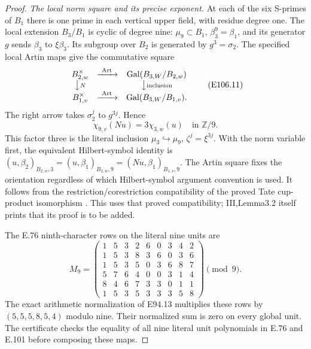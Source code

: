 \begin{proof}
\emph{The local norm square and its precise exponent.}
At each of the six S-primes of $B_1$ there is one prime in
each vertical upper field, with residue degree one.
The local extension $B_3/B_1$ is cyclic of degree nine:
$\mu_9\subset B_1$, $\beta_3^9=\beta_1$, and its generator
$g$ sends $\beta_3$ to $\xi\beta_3$. Its subgroup over
$B_2$ is generated by $g^3=\sigma_2$.
The specified local Artin maps give the commutative square
\[
 \begin{array}{ccc}
 B_{2,w}^{\times}&\xrightarrow{\ \mathrm{Art}\ }&
             \operatorname{Gal}(B_{3,W}/B_{2,w})\\
 \big\downarrow\scriptstyle N&&\big\downarrow\scriptstyle\mathrm{inclusion}\\
 B_{1,v}^{\times}&\xrightarrow{\ \mathrm{Art}\ }&
             \operatorname{Gal}(B_{3,W}/B_{1,v}).
 \end{array}
 \tag{E106.11}
\]
The right arrow takes $\sigma_2^j$ to $g^{3j}$. Hence
\[
       \chi_{9,v}(Nu)=3\chi_{3,w}(u)\quad\text{in }\mathbb Z/9.
 \tag{E106.12}
\]
This factor three is the literal inclusion
$\mu_3\hookrightarrow\mu_9$, $\zeta^j=\xi^{3j}$.
With the norm variable first, the equivalent Hilbert-symbol
identity is
$(u,\beta_2)_{B_{2,w},3}
 =(u,\beta_1)_{B_{2,w},9}
 =(Nu,\beta_1)_{B_{1,v},9}$.
The Artin square fixes the orientation regardless of
which Hilbert-symbol argument convention is used.
It follows from the restriction/corestriction compatibility
of the proved Tate cup-product isomorphism
\cite[III,Theorem3.1 and its following proof; III,\S4]{E_MilneCFT}.
This uses that proved compatibility; III,Lemma3.2 itself
prints that its proof is to be added.

The E.76 ninth-character rows on the literal nine units are
\[
 M_9=\begin{pmatrix}
 1&5&3&2&6&0&3&4&2\\
 1&5&3&8&3&6&0&3&6\\
 1&5&3&5&0&3&6&8&7\\
 5&7&6&4&0&0&3&1&4\\
 8&4&6&7&3&3&0&1&1\\
 1&5&3&5&3&3&3&5&8
 \end{pmatrix}\pmod9.
 \tag{E106.13}
\]
The exact arithmetic normalization of E94.13 multiplies
these rows by $(5,5,5,8,5,4)$ modulo nine. Their normalized
sum is zero on every global unit. The certificate checks
the equality of all nine literal unit polynomials in E.76
and E.101 before composing these maps.


\end{proof}
